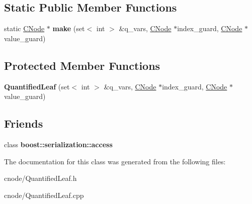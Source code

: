 \subsection*{\-Static \-Public \-Member \-Functions}
\begin{DoxyCompactItemize}
\item 
\hypertarget{classQuantifiedLeaf_a7161b27997f0d66fbb4ab491c777619e}{static \hyperlink{classCNode}{\-C\-Node} $\ast$ {\bfseries make} (set$<$ int $>$ \&q\-\_\-vars, \hyperlink{classCNode}{\-C\-Node} $\ast$index\-\_\-guard, \hyperlink{classCNode}{\-C\-Node} $\ast$value\-\_\-guard)}\label{classQuantifiedLeaf_a7161b27997f0d66fbb4ab491c777619e}

\end{DoxyCompactItemize}
\subsection*{\-Protected \-Member \-Functions}
\begin{DoxyCompactItemize}
\item 
\hypertarget{classQuantifiedLeaf_a577808987e7b5646592b282fb3f24386}{{\bfseries \-Quantified\-Leaf} (set$<$ int $>$ \&q\-\_\-vars, \hyperlink{classCNode}{\-C\-Node} $\ast$index\-\_\-guard, \hyperlink{classCNode}{\-C\-Node} $\ast$value\-\_\-guard)}\label{classQuantifiedLeaf_a577808987e7b5646592b282fb3f24386}

\end{DoxyCompactItemize}
\subsection*{\-Friends}
\begin{DoxyCompactItemize}
\item 
\hypertarget{classQuantifiedLeaf_ac98d07dd8f7b70e16ccb9a01abf56b9c}{class {\bfseries boost\-::serialization\-::access}}\label{classQuantifiedLeaf_ac98d07dd8f7b70e16ccb9a01abf56b9c}

\end{DoxyCompactItemize}


\-The documentation for this class was generated from the following files\-:\begin{DoxyCompactItemize}
\item 
cnode/\-Quantified\-Leaf.\-h\item 
cnode/\-Quantified\-Leaf.\-cpp\end{DoxyCompactItemize}

